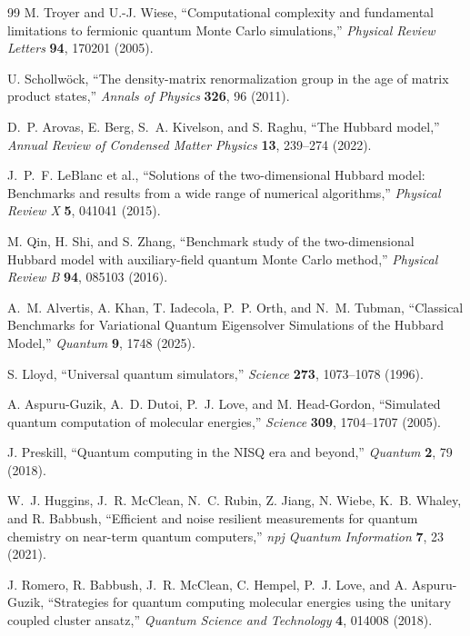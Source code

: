 \documentclass[
  reprint,
  amsmath,
  amssymb,
  aps,
  pra,
  nofootinbib,
  superscriptaddress,
  floatfix
]{revtex4-2}
\begin{document}
\begin{thebibliography}{99}
M. Troyer and U.-J. Wiese,
``Computational complexity and fundamental limitations to fermionic quantum Monte Carlo simulations,''
\emph{Physical Review Letters} \textbf{94}, 170201 (2005).

U. Schollw\"ock,
``The density-matrix renormalization group in the age of matrix product states,''
\emph{Annals of Physics} \textbf{326}, 96 (2011).

D.~P. Arovas, E. Berg, S.~A. Kivelson, and S. Raghu,
``The Hubbard model,''
\emph{Annual Review of Condensed Matter Physics} \textbf{13}, 239--274 (2022).

J.~P.~F. LeBlanc et al.,
``Solutions of the two-dimensional Hubbard model: Benchmarks and results from a wide range of numerical algorithms,''
\emph{Physical Review X} \textbf{5}, 041041 (2015).

M. Qin, H. Shi, and S. Zhang,
``Benchmark study of the two-dimensional Hubbard model with auxiliary-field quantum Monte Carlo method,''
\emph{Physical Review B} \textbf{94}, 085103 (2016).

A.~M. Alvertis, A. Khan, T. Iadecola, P.~P. Orth, and N.~M. Tubman,
``Classical Benchmarks for Variational Quantum Eigensolver Simulations of the Hubbard Model,''
\emph{Quantum} \textbf{9}, 1748 (2025).

S. Lloyd,
``Universal quantum simulators,''
\emph{Science} \textbf{273}, 1073--1078 (1996).

A. Aspuru-Guzik, A.~D. Dutoi, P.~J. Love, and M. Head-Gordon,
``Simulated quantum computation of molecular energies,''
\emph{Science} \textbf{309}, 1704--1707 (2005).

J. Preskill,
``Quantum computing in the NISQ era and beyond,''
\emph{Quantum} \textbf{2}, 79 (2018).

W.~J. Huggins, J.~R. McClean, N.~C. Rubin, Z. Jiang, N. Wiebe, K.~B. Whaley, and R. Babbush,
``Efficient and noise resilient measurements for quantum chemistry on near-term quantum computers,''
\emph{npj Quantum Information} \textbf{7}, 23 (2021).

J. Romero, R. Babbush, J.~R. McClean, C. Hempel, P.~J. Love, and A. Aspuru-Guzik,
``Strategies for quantum computing molecular energies using the unitary coupled cluster ansatz,''
\emph{Quantum Science and Technology} \textbf{4}, 014008 (2018).


\end{thebibliography}
\end{document}
